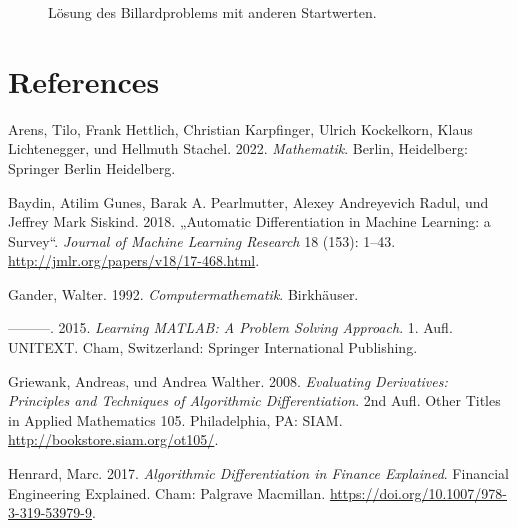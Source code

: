 \documentclass[
  letterpaper,
  DIV=11,
  oneside]{scrreprt}
\newlength{\cslhangindent}
\newlength{\cslentryspacingunit} %
\newenvironment{CSLReferences}[2] %
 {%
  \setlength{\parindent}{0pt}
  \ifodd #1
  \let\oldpar\par
  \def\par{\hangindent=\cslhangindent\oldpar}
  \fi
  \setlength{\parskip}{#2\cslentryspacingunit}
 }%
 {}
\theoremstyle{definition}
\theoremstyle{definition}
\theoremstyle{remark}
\begin{document}
\begin{tcolorbox}
\begin{figure}[H]
{}

\caption{\label{fig-billardproblemsolutionwithmathsad}Lösung des
Billardproblems mit anderen Startwerten.}

\end{figure}

\end{tcolorbox}


\hypertarget{references}{%
\chapter*{References}\label{references}}


\hypertarget{refs}{}
\begin{CSLReferences}{1}{0}
\leavevmode{}%
Arens, Tilo, Frank Hettlich, Christian Karpfinger, Ulrich Kockelkorn,
Klaus Lichtenegger, und Hellmuth Stachel. 2022. \emph{Mathematik}.
Berlin, Heidelberg: Springer Berlin Heidelberg.

\leavevmode{}%
Baydin, Atilim Gunes, Barak A. Pearlmutter, Alexey Andreyevich Radul,
und Jeffrey Mark Siskind. 2018. {„Automatic Differentiation in Machine
Learning: a Survey``}. \emph{Journal of Machine Learning Research} 18
(153): 1--43. \url{http://jmlr.org/papers/v18/17-468.html}.

\leavevmode{}%
Gander, Walter. 1992. \emph{Computermathematik}. Birkhäuser.

\leavevmode{}%
---------. 2015. \emph{Learning {MATLAB}: A Problem Solving Approach}.
1. Aufl. UNITEXT. Cham, Switzerland: Springer International Publishing.

\leavevmode{}%
Griewank, Andreas, und Andrea Walther. 2008. \emph{Evaluating
Derivatives: {P}rinciples and Techniques of Algorithmic
Differentiation}. 2nd Aufl. Other Titles in Applied Mathematics 105.
Philadelphia, PA: SIAM. \url{http://bookstore.siam.org/ot105/}.

\leavevmode{}%
Henrard, Marc. 2017. \emph{Algorithmic Differentiation in Finance
Explained}. Financial Engineering Explained. Cham: Palgrave Macmillan.
\url{https://doi.org/10.1007/978-3-319-53979-9}.


\end{CSLReferences}
\end{document}
